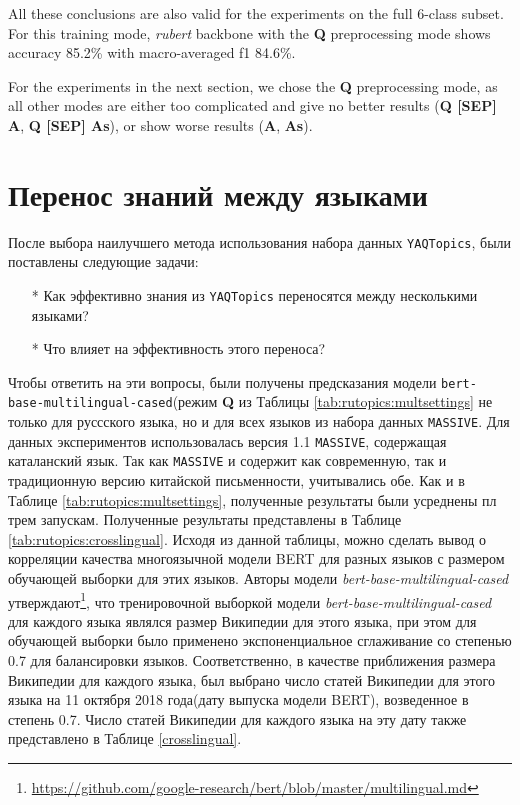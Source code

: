 All these conclusions are also valid for the experiments on the full 6-class subset. For this training mode, 
 \textit{rubert} backbone with the \textbf{Q} preprocessing mode shows accuracy 85.2\% with macro-averaged f1 84.6\%.

For the experiments in the next section, we chose the \textbf{Q} preprocessing mode, as all other modes are either too complicated and give no better results (\textbf{Q [SEP] A}, \textbf{Q [SEP] As}), or show worse results (\textbf{A}, \textbf{As}).





\section{Перенос знаний между языками}
После выбора наилучшего метода использования набора данных \texttt{YAQTopics}, были поставлены следующие задачи:
\begin{itemize}
\item[*]Как эффективно знания из \texttt{YAQTopics} переносятся между несколькими языками?
\item[*]Что влияет на эффективность этого переноса?
\end{itemize}
Чтобы ответить на эти вопросы, были получены предсказания модели \texttt{bert-base-multilingual-cased}(режим \textbf{Q} из Таблицы \ref{tab:rutopics:multsettings} не только для руссского языка, но и для всех языков из набора данных \texttt{MASSIVE}. Для данных экспериментов использовалась версия 1.1 \texttt{MASSIVE}, содержащая каталанский язык. Так как \texttt{MASSIVE} и содержит как современную, так и традиционную версию китайской письменности, учитывались обе. Как и в Таблице \ref{tab:rutopics:multsettings}, полученные результаты были усреднены пл трем запускам.
Полученные результаты представлены в Таблице \ref{tab:rutopics:crosslingual}. Исходя из данной таблицы, можно сделать вывод о корреляции качества многоязычной модели BERT для разных языков с размером обучающей выборки для этих языков. Авторы модели \textit{bert-base-multilingual-cased} утверждают\footnote{\url{https://github.com/google-research/bert/blob/master/multilingual.md}}, что тренировочной выборкой модели \textit{bert-base-multilingual-cased} для каждого языка являлся размер Википедии для этого языка, при этом для обучающей выборки было применено экспоненциальное сглаживание со степенью 0.7 для балансировки языков.
Соответственно, в качестве приближения размера Википедии для каждого языка, был выбрано число статей Википедии для этого языка на 11 октября 2018 года(дату выпуска модели BERT), возведенное в степень 0.7.  Число статей Википедии для каждого языка на эту дату также представлено в Таблице \ref{crosslingual}.



